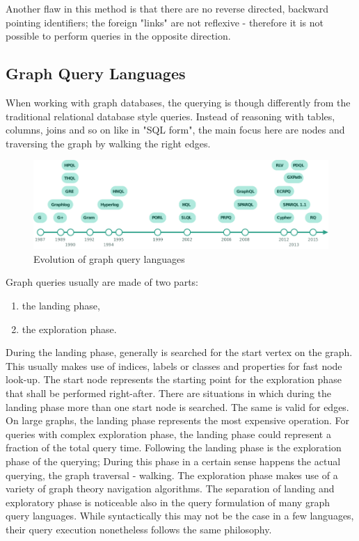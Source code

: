 Another flaw in this method is that there are no reverse directed, backward pointing identifiers;
the foreign "links" are not reflexive - therefore it is not possible to perform queries in the opposite direction.

\subsection{Graph Query Languages} \label{subsection:LiteratureReview/ReviewofGraphDatabaseSystems/GraphQueryLanguages}
When working with graph databases, the querying is though differently from the traditional relational database style queries.
Instead of reasoning with tables, columns, joins and so on like in "SQL form", the main focus here are nodes and traversing the graph by walking the right edges.

\begin{figure}[H]%
	\centering%
	\includegraphics[width=1\textwidth]{images/chapter2/AnglesGutierrez2018graphquerylangpage21.pdf}%
	\caption[Evolution of graph query languages]{Evolution of graph query languages}%
	\label{fig:AnglesGutierrez2018graphquerylangpage21}%
\end{figure}%

Graph queries usually are made of two parts:
 \begin{enumerate}[noitemsep]
	\item the landing phase,
	\item the exploration phase.
\end{enumerate}

During the landing phase, generally is searched for the start vertex on the graph.
This usually makes use of indices, labels or classes and properties for fast node look-up.
The start node represents the starting point for the exploration phase that shall be performed right-after.
There are situations in which during the landing phase more than one start node is searched.
The same is valid for edges.
On large graphs, the landing phase represents the most expensive operation.
For queries with complex exploration phase, the landing phase could represent a fraction of the total query time.
Following the landing phase is the exploration phase of the querying;
During this phase in a certain sense happens the actual querying, the graph traversal - walking.
The exploration phase makes use of a variety of graph theory navigation algorithms.
The separation of landing and exploratory phase is noticeable also in the query formulation of many graph query languages.
While syntactically this may not be the case in a few languages, their query execution nonetheless follows the same philosophy.

